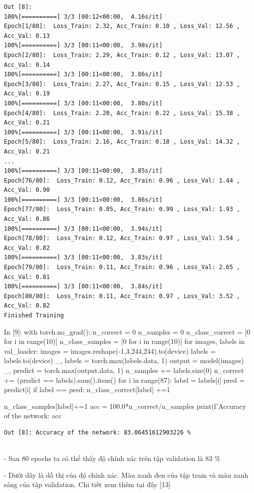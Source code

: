 \documentclass[12pt, a4paper]{article}
\begin{document}
\begin{verbatim}
Out [8]:
100%[==========] 3/3 [00:12<00:00,  4.16s/it]
Epoch[1/80]:  Loss_Train: 2.32, Acc_Train: 0.10 , Loss_Val: 12.56 , Acc_Val: 0.13
100%[==========] 3/3 [00:11<00:00,  3.98s/it]
Epoch[2/80]:  Loss_Train: 2.29, Acc_Train: 0.12 , Loss_Val: 13.07 , Acc_Val: 0.14
100%[==========] 3/3 [00:11<00:00,  3.86s/it]
Epoch[3/80]:  Loss_Train: 2.27, Acc_Train: 0.15 , Loss_Val: 12.53 , Acc_Val: 0.19
100%[==========] 3/3 [00:11<00:00,  3.80s/it]
Epoch[4/80]:  Loss_Train: 2.20, Acc_Train: 0.22 , Loss_Val: 15.38 , Acc_Val: 0.21
100%[==========] 3/3 [00:11<00:00,  3.91s/it]
Epoch[5/80]:  Loss_Train: 2.16, Acc_Train: 0.18 , Loss_Val: 14.32 , Acc_Val: 0.21
...
100%[==========] 3/3 [00:11<00:00,  3.85s/it]
Epoch[76/80]:  Loss_Train: 0.12, Acc_Train: 0.96 , Loss_Val: 1.44 , Acc_Val: 0.90
100%[==========] 3/3 [00:11<00:00,  3.86s/it]
Epoch[77/80]:  Loss_Train: 0.05, Acc_Train: 0.99 , Loss_Val: 1.93 , Acc_Val: 0.86
100%[==========] 3/3 [00:11<00:00,  3.94s/it]
Epoch[78/80]:  Loss_Train: 0.12, Acc_Train: 0.97 , Loss_Val: 3.54 , Acc_Val: 0.82
100%[==========] 3/3 [00:11<00:00,  3.83s/it]
Epoch[79/80]:  Loss_Train: 0.11, Acc_Train: 0.96 , Loss_Val: 2.65 , Acc_Val: 0.81
100%[==========] 3/3 [00:11<00:00,  3.84s/it]
Epoch[80/80]:  Loss_Train: 0.11, Acc_Train: 0.97 , Loss_Val: 3.52 , Acc_Val: 0.82
Finished Training

\end{verbatim}
\begin{python}
In [9]: with torch.no_grad():
            n_correct = 0
            n_samples = 0
            n_class_correct = [0 for i in range(10)]
            n_class_samples = [0 for i in range(10)]   
            for images, labels in val_loader:
                images = images.reshape(-1,3,244,244).to(device)
                labels = labels.to(device)
                _, labels = torch.max(labels.data, 1)
                output = model(images)  
                _, predict = torch.max(output.data, 1)
                n_samples += labels.size(0)
                n_correct += (predict == labels).sum().item() 
                for i in range(87):
                    label = labels[i]
                    pred = predict[i]
                    if label == pred:
                        n_class_correct[label] +=1
                        
                    n_class_samples[label]+=1       
            acc = 100.0*n_correct/n_samples
            print(f'Accuracy of the network: {acc} %
\end{python}
\begin{verbatim}
Out [8]: Accuracy of the network: 83.06451612903226 %
    
\end{verbatim}
\par- Sau 80 epochs ta có thể thấy độ chính xác trên tập validation là 83 $\%$
\par- Dưới dây là dồ thị của độ chính xác. Màu xanh đen của tập train và màu xanh sáng của tập validation.
Chi tiết xem thêm tại đây [13]
\end{document}
